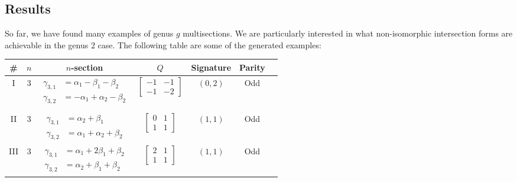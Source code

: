 \subsection{Results}

So far, we have found many examples of genus $g$ multisections. We are particularly interested in what non-isomorphic intersection forms are achievable in the genus $2$ case. The following table are some of the generated examples:
\begin{center}
	\begin{tabular}{|c|c|c|c|c|c|c|}
		\hline
		\# & $n$ & $n$-section & $Q$ & Signature & Parity\\%
		\hline
		I & $3$ & \parbox{4.25cm}{\begin{align*}
			\gamma_{3,1} &= \alpha_1 - \beta_1 - \beta_2\\
			\gamma_{3,2} &= -\alpha_1 + \alpha_2 - \beta_2\\
		\end{align*}} & $\begin{bmatrix} -1 & -1\\-1 & -2 \end{bmatrix}$ & $(0,2)$ & Odd\\%
		\hline
		II & $3$ & \parbox{4.25cm}{\begin{align*}
			\gamma_{3,1} &= \alpha_2 + \beta_1\\
			\gamma_{3,2} &= \alpha_1 + \alpha_2 + \beta_2
		\end{align*}} & $\begin{bmatrix} 0 & 1\\1 & 1 \end{bmatrix}$ & $(1,1)$ & Odd\\%
		\hline
		III & $3$ & \parbox{4.25cm}{\begin{align*}
			\gamma_{3,1} &= \alpha_1 + 2\beta_1 + \beta_2\\
			\gamma_{3,2} &= \alpha_2 + \beta_1 + \beta_2
		\end{align*}} & $\begin{bmatrix} 2 & 1\\1 & 1 \end{bmatrix}$ & $(1,1)$ & Odd\\%
		\hline

\end{tabular}
\end{center}
